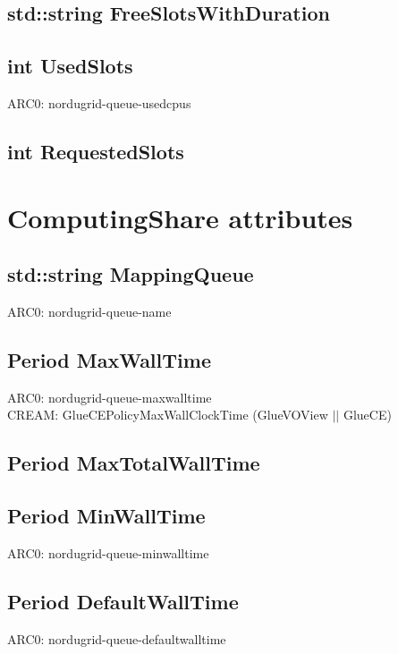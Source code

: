 \documentclass{book}
\begin{document}
\subsection*{std::string FreeSlotsWithDuration}

\subsection*{int UsedSlots}

ARC0: nordugrid-queue-usedcpus

\subsection*{int RequestedSlots}

\section{ComputingShare attributes}

\subsection*{std::string MappingQueue}

ARC0: nordugrid-queue-name

\subsection*{Period MaxWallTime}

ARC0: nordugrid-queue-maxwalltime \\
CREAM: GlueCEPolicyMaxWallClockTime (GlueVOView $||$ GlueCE)

\subsection*{Period MaxTotalWallTime}

\subsection*{Period MinWallTime}

ARC0: nordugrid-queue-minwalltime

\subsection*{Period DefaultWallTime}

ARC0: nordugrid-queue-defaultwalltime
\end{document}
